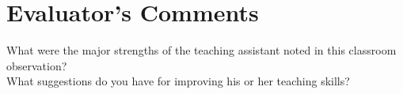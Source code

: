 \documentclass{article}
\begin{document}
\section{Evaluator's Comments}

What were the major strengths of the teaching assistant noted in this classroom observation?\\
\vfill
What suggestions do you have for improving his  or her teaching skills?\\
\vfill
\end{document}
